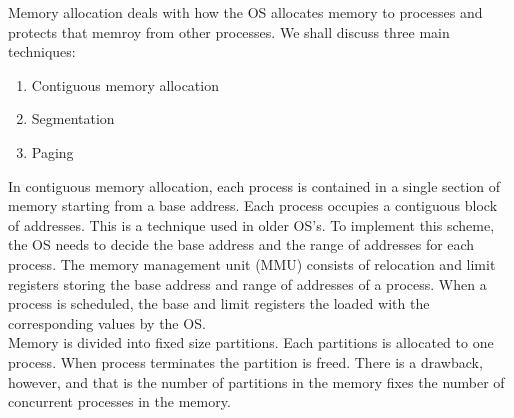 \documentclass[a4paper]{article}
\theoremstyle{plain}
\theoremstyle{definition}
\newtheorem{defn}{Definition}[section]
\theoremstyle{remark}
\begin{document}
\begin{tcolorbox}[colback=black!3!white,colframe=black!60!white,title=\begin{defn}Memory Allocation \label{Memory Allocation}\end{defn}]
Memory allocation deals with how the OS allocates memory to processes and protects that memroy from other processes. We shall discuss three main techniques:
\begin{enumerate}
	\item Contiguous memory allocation
	\item Segmentation
	\item Paging
\end{enumerate}
\end{tcolorbox}
\begin{tcolorbox}[colback=black!3!white,colframe=black!60!white,title=\begin{defn}Contiguous Memory Allocation \label{Contiguous Memory Allocation}\end{defn}]
In contiguous memory allocation, each process is contained in a single section of memory starting from a base address. Each process occupies a contiguous block of addresses. This is a technique used in older OS's. To implement this scheme, the OS needs to decide the base address and the range of addresses for each process. The memory management unit (MMU) consists of relocation and limit registers storing the base address and range of addresses of a process. When a process is scheduled, the base and limit registers the loaded with the corresponding values by the OS. \\

Memory is divided into fixed size partitions. Each partitions is allocated to one process. When process terminates the partition is freed. There is a drawback, however, and that is the number of partitions in the memory fixes the number of concurrent processes in the memory. \\


\end{tcolorbox}
\end{document}
